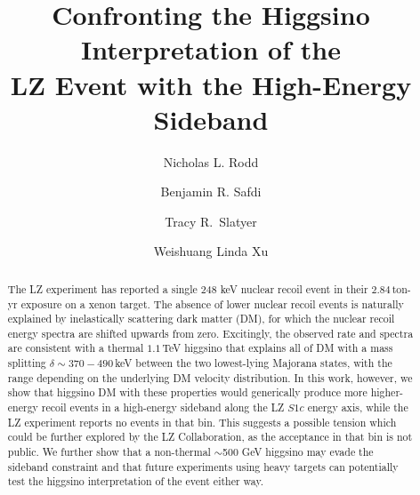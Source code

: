 \documentclass[reprint,superscriptaddress,preprintnumbers,amsmath,amssymb,aps,prd,tightenlines,longbibliography,nofootinbib]{revtex4-2}
\begin{document}
\title{Confronting the Higgsino Interpretation of the \\LZ Event with the High-Energy Sideband}

\author{Nicholas L. Rodd}

\author{Benjamin R. Safdi}

\author{Tracy R.~Slatyer}

\author{Weishuang Linda Xu}

\begin{abstract}
The LZ experiment has reported a single 248 keV nuclear recoil event in their $2.84$\,ton-yr exposure on a xenon target. The absence of lower nuclear recoil events is naturally explained by inelastically scattering dark matter (DM), for which the nuclear recoil energy spectra are shifted upwards from zero. Excitingly, the observed rate and spectra are consistent with a thermal $1.1$\,TeV higgsino that explains all of DM with a mass splitting $\delta \sim 370 - 490$\,keV between the two lowest-lying Majorana states, with the range depending on the underlying DM velocity distribution. In this work, however, we show that higgsino DM with these properties would generically produce more higher-energy recoil events in a high-energy sideband along the LZ $S1c$ energy axis, while the LZ experiment reports no events in that bin. This suggests a possible tension which could be further explored by the LZ Collaboration, as the acceptance in that bin is not public.
We further show that a non-thermal $\sim$500 GeV higgsino may evade the sideband constraint and that future experiments using heavy targets can potentially test the higgsino interpretation of the event either way.  
\end{abstract}
\end{document}
